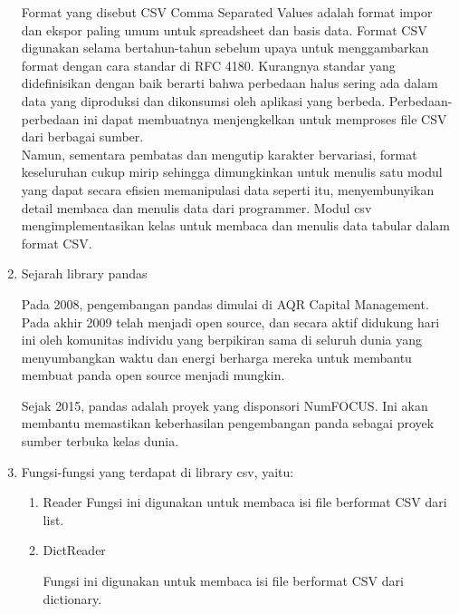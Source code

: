 \begin{enumerate}
	\hspace*{1cm}Format yang disebut CSV Comma Separated Values adalah format impor dan ekspor paling umum untuk spreadsheet dan basis data. Format CSV digunakan selama bertahun-tahun sebelum upaya untuk menggambarkan format dengan cara standar di RFC 4180. Kurangnya standar yang dideﬁnisikan dengan baik berarti bahwa perbedaan halus sering ada dalam data yang diproduksi dan dikonsumsi oleh aplikasi yang berbeda. Perbedaan-perbedaan ini dapat membuatnya menjengkelkan untuk memproses ﬁle CSV dari berbagai sumber.\\
\hspace*{1cm} Namun, sementara pembatas dan mengutip karakter bervariasi, format keseluruhan cukup mirip sehingga dimungkinkan untuk menulis satu modul yang dapat secara eﬁsien memanipulasi data seperti itu, menyembunyikan detail membaca dan menulis data dari programmer. Modul csv mengimplementasikan kelas untuk membaca dan menulis data tabular dalam format CSV.

	\newpage 
	\item Sejarah library pandas
	
	\hspace*{1cm}Pada 2008, pengembangan pandas dimulai di AQR Capital Management. Pada akhir 2009 telah menjadi open source, dan secara aktif didukung hari ini oleh komunitas individu yang berpikiran sama di seluruh dunia yang menyumbangkan waktu dan energi berharga mereka untuk membantu membuat panda open source menjadi mungkin.
	
	\hspace*{1cm}Sejak 2015, pandas adalah proyek yang disponsori NumFOCUS. Ini akan membantu memastikan keberhasilan pengembangan panda sebagai proyek sumber terbuka kelas dunia.
	
    \item Fungsi-fungsi yang terdapat di library csv, yaitu:
	\begin{enumerate}
		\item Reader
		 Fungsi ini digunakan untuk membaca isi file berformat CSV dari list.
		
		
		
		\item DictReader
		
		Fungsi ini digunakan untuk membaca isi file berformat CSV dari dictionary.
		
		
		

\end{enumerate}
\end{enumerate}
